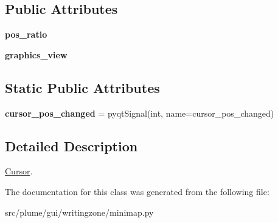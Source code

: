 \subsection*{Public Attributes}
\begin{DoxyCompactItemize}
\item 
{\bfseries pos\+\_\+ratio}\hypertarget{classplume-creator_1_1src_1_1plume_1_1gui_1_1writingzone_1_1minimap_1_1_cursor_af0c1f7f4e750aeebcd824521533a3dc7}{}\label{classplume-creator_1_1src_1_1plume_1_1gui_1_1writingzone_1_1minimap_1_1_cursor_af0c1f7f4e750aeebcd824521533a3dc7}

\item 
{\bfseries graphics\+\_\+view}\hypertarget{classplume-creator_1_1src_1_1plume_1_1gui_1_1writingzone_1_1minimap_1_1_cursor_acb1a03367abc65f2c38b6f484f4970f0}{}\label{classplume-creator_1_1src_1_1plume_1_1gui_1_1writingzone_1_1minimap_1_1_cursor_acb1a03367abc65f2c38b6f484f4970f0}

\end{DoxyCompactItemize}
\subsection*{Static Public Attributes}
\begin{DoxyCompactItemize}
\item 
{\bfseries cursor\+\_\+pos\+\_\+changed} = pyqt\+Signal(int, name=\textquotesingle{}cursor\+\_\+pos\+\_\+changed\textquotesingle{})\hypertarget{classplume-creator_1_1src_1_1plume_1_1gui_1_1writingzone_1_1minimap_1_1_cursor_a541a83021061624c0808327a8d8377d6}{}\label{classplume-creator_1_1src_1_1plume_1_1gui_1_1writingzone_1_1minimap_1_1_cursor_a541a83021061624c0808327a8d8377d6}

\end{DoxyCompactItemize}


\subsection{Detailed Description}
\hyperlink{classplume-creator_1_1src_1_1plume_1_1gui_1_1writingzone_1_1minimap_1_1_cursor}{Cursor}. 

The documentation for this class was generated from the following file\+:\begin{DoxyCompactItemize}
\item 
src/plume/gui/writingzone/minimap.\+py\end{DoxyCompactItemize}

